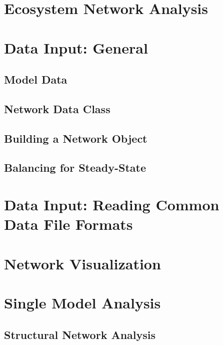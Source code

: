 \documentclass[12pt]{article}
\title{}
\author{M.K. Lau}
\begin{document}

\setcounter{tocdepth}{3}  %
\tableofcontents


\section[Ecosystem Network Analysis]{Ecosystem Network Analysis}

\section{Data Input: General}

\subsection{Model Data} \label{sec:data}



\subsection{Network Data Class}

\subsection{Building a Network Object}



\subsection{Balancing for Steady-State}

\section{Data Input: Reading Common Data File Formats}

\section{Network Visualization}

\section{Single Model Analysis}



\subsection{Structural Network Analysis}
\end{document}
